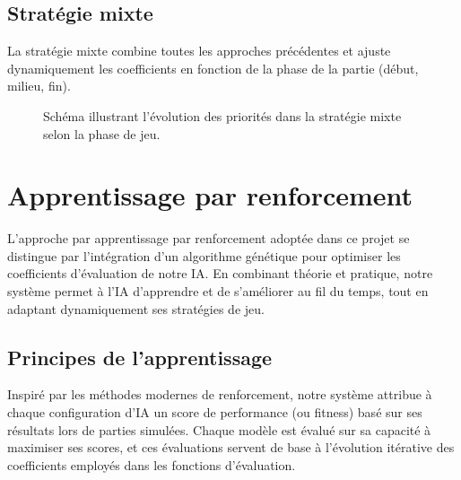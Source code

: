 \documentclass[a4paper,12pt]{article}
\begin{document}
\subsection{Stratégie mixte}
La stratégie mixte combine toutes les approches précédentes et ajuste dynamiquement les coefficients en fonction de la phase de la partie (début, milieu, fin).
\begin{figure}[H]
\centering
{}
\caption{Schéma illustrant l'évolution des priorités dans la stratégie mixte selon la phase de jeu.}
\label{fig:mixed}
\end{figure}

\section{Apprentissage par renforcement}

L'approche par apprentissage par renforcement adoptée dans ce projet se distingue par l'intégration d'un algorithme génétique pour optimiser les coefficients d'évaluation de notre IA. En combinant théorie et pratique, notre système permet à l'IA d'apprendre et de s'améliorer au fil du temps, tout en adaptant dynamiquement ses stratégies de jeu.

\subsection{Principes de l'apprentissage}
Inspiré par les méthodes modernes de renforcement, notre système attribue à chaque configuration d'IA un score de performance (ou fitness) basé sur ses résultats lors de parties simulées. Chaque modèle est évalué sur sa capacité à maximiser ses scores, et ces évaluations servent de base à l'évolution itérative des coefficients employés dans les fonctions d'évaluation.
\end{document}
